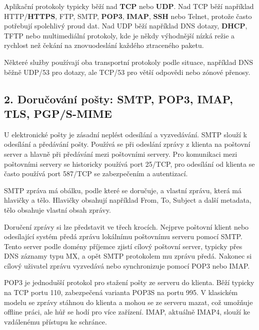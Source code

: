 Aplikační protokoly typicky běží nad \textbf{TCP} nebo \textbf{UDP}. Nad TCP běží například HTTP/\textbf{HTTPS}, FTP, SMTP, \textbf{POP3}, \textbf{IMAP}, \textbf{SSH} nebo Telnet, protože často potřebují spolehlivý proud dat. Nad UDP běží například DNS dotazy, \textbf{DHCP}, TFTP nebo multimediální protokoly, kde je někdy výhodnější nízká režie a rychlost než čekání na znovuodeslání každého ztraceného paketu.

Některé služby používají oba transportní protokoly podle situace, například DNS běžně UDP/53 pro dotazy, ale TCP/53 pro větší odpovědi nebo zónové přenosy.


\subsection*{2. Doručování pošty: SMTP, POP3, IMAP, TLS, PGP/S-MIME}

U elektronické pošty je zásadní neplést odesílání a vyzvedávání. SMTP slouží k odesílání a předávání pošty. Používá se při odeslání zprávy z klienta na poštovní server a hlavně při předávání mezi poštovními servery. Pro komunikaci mezi poštovními servery se historicky používá port 25/TCP, pro odesílání od klienta se často používá port 587/TCP se zabezpečením a autentizací.

SMTP zpráva má obálku, podle které se doručuje, a vlastní zprávu, která má hlavičky a tělo. Hlavičky obsahují například From, To, Subject a další metadata, tělo obsahuje vlastní obsah zprávy.

Doručení zprávy si lze představit ve třech krocích. Nejprve poštovní klient nebo odesílající systém předá zprávu lokálnímu poštovnímu serveru pomocí SMTP. Tento server podle domény příjemce zjistí cílový poštovní server, typicky přes DNS záznamy typu MX, a opět SMTP protokolem mu zprávu předá. Nakonec si cílový uživatel zprávu vyzvedává nebo synchronizuje pomocí POP3 nebo IMAP.

POP3 je jednodušší protokol pro stažení pošty ze serveru do klienta. Běží typicky na TCP portu 110, zabezpečená varianta POP3S na portu 995. V klasickém modelu se zprávy stáhnou do klienta a mohou se ze serveru mazat, což umožňuje offline práci, ale hůř se hodí pro více zařízení. IMAP, aktuálně IMAP4, slouží ke vzdálenému přístupu ke schránce.

